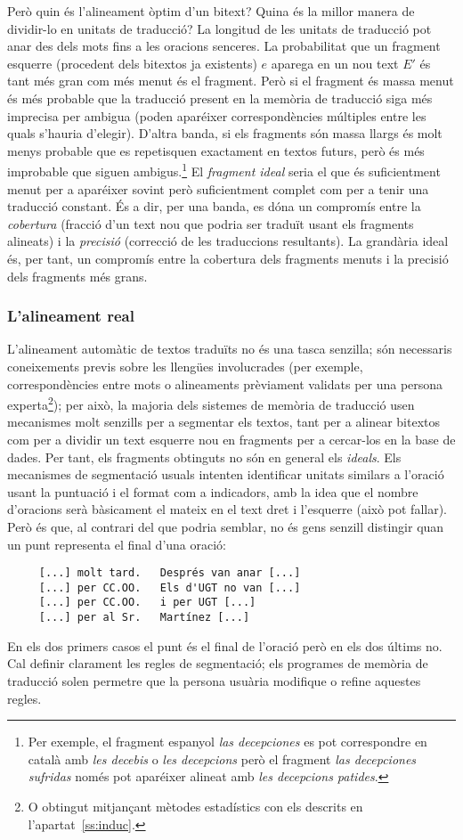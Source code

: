 Però quin és l'alineament òptim d'un bitext? Quina és la millor manera
de dividir-lo en unitats de traducció?  La longitud de les unitats de
traducció pot anar des dels mots fins a les oracions senceres. La
probabilitat que un fragment esquerre (procedent dels bitextos ja
existents) $e$ aparega en un nou text $E'$ és tant més gran com més
menut és el fragment. Però si el fragment és massa menut és més probable que
la traducció present en la memòria de traducció siga més imprecisa per
ambigua (poden aparéixer correspondències múltiples entre les quals
s'hauria d'elegir).  D'altra banda, si els fragments són massa llargs
és molt menys probable que es repetisquen exactament en textos futurs,
però és més improbable que siguen ambigus.\footnote{Per exemple, el
  fragment espanyol \emph{las decepciones} es pot correspondre en
  català amb \emph{les decebis} o \emph{les decepcions} però el
  fragment \emph{las decepciones sufridas} només pot aparéixer alineat
  amb \emph{les decepcions patides}.} El \emph{fragment ideal} seria
el que és suficientment menut per a aparéixer sovint però
suficientment complet com per a tenir una traducció constant. És a
dir, per una banda, es dóna un compromís entre la \emph{cobertura}
(fracció d'un text nou que podria ser traduït usant els fragments
alineats) i la \emph{precisió} (correcció de les traduccions
resultants).  La grandària ideal és, per tant, un compromís entre la
cobertura dels fragments menuts i la precisió dels fragments més
grans.

\subsubsection{L'alineament real}

L'alineament automàtic de textos traduïts no és una tasca senzilla;
són necessaris coneixements previs sobre les llengües involucrades
(per exemple, correspondències entre mots o alineaments prèviament
validats per una persona experta\footnote{O obtingut mitjançant
  mètodes estadístics con els descrits en l'apartat~\ref{ss:induc}.});
per això, la majoria dels sistemes de memòria de traducció usen
mecanismes molt senzills per a segmentar els textos, tant per a
alinear bitextos com per a dividir un text esquerre nou en fragments
per a cercar-los en la base de dades. Per tant, els fragments
obtinguts no són en general els \emph{ideals}.  Els mecanismes de
segmentació usuals intenten identificar unitats similars a l'oració
usant la puntuació i el format com a indicadors, amb la idea que el
nombre d'oracions serà bàsicament el mateix en el text dret i
l'esquerre (això pot fallar). Però és que, al contrari del que podria
semblar, no és gens senzill distingir quan un punt representa el final
d'una oració:
\begin{verbatim}
     [...] molt tard.   Després van anar [...] 
     [...] per CC.OO.   Els d'UGT no van [...] 
     [...] per CC.OO.   i per UGT [...]          
     [...] per al Sr.   Martínez [...]             
\end{verbatim}
En els dos primers casos el punt és el final de l'oració però en els
dos últims no. Cal definir clarament les regles de segmentació; els
programes de memòria de traducció solen permetre que la persona
usuària modifique o refine aquestes regles.

